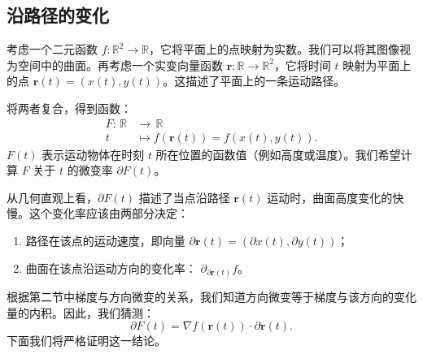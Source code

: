 \documentclass[12pt,UTF8]{ctexbook}
\begin{document}
\subsection{沿路径的变化}

考虑一个二元函数 $f: \mathbb{R}^2 \to \mathbb{R}$，它将平面上的点映射为实数。我们可以将其图像视为空间中的曲面。再考虑一个实变向量函数 $\mathbf{r}: \mathbb{R} \to \mathbb{R}^2$，它将时间 $t$ 映射为平面上的点 $\mathbf{r}(t) = (x(t), y(t))$。这描述了平面上的一条运动路径。

将两者复合，得到函数：
\begin{align*}
    F: \,\mathbb{R} &\to\, \mathbb{R}\\
    t\, &\mapsto f(\mathbf{r}(t)) = f(x(t), y(t)).
\end{align*}
$F(t)$ 表示运动物体在时刻 $t$ 所在位置的函数值（例如高度或温度）。我们希望计算 $F$ 关于 $t$ 的微变率 $\partial F(t)$。


从几何直观上看，$\partial F(t)$ 描述了当点沿路径 $\mathbf{r}(t)$ 运动时，曲面高度变化的快慢。这个变化率应该由两部分决定：
\begin{enumerate}
\item 路径在该点的运动速度，即向量 $\partial\mathbf{r}(t) = \left(\partial x(t), \partial y(t)\right)$；
\item 曲面在该点沿运动方向的变化率： $\partial_{\partial\mathbf{r}(t)} f$。
\end{enumerate}
根据第二节中梯度与方向微变的关系，我们知道方向微变等于梯度与该方向的变化量的内积。因此，我们猜测：
$$ \partial F(t) = \nabla f(\mathbf{r}(t)) \cdot \partial\mathbf{r}(t). $$
下面我们将严格证明这一结论。
\end{document}
